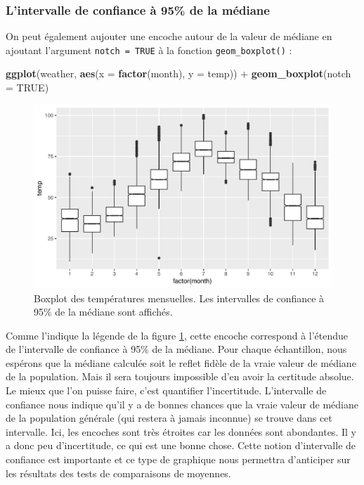 \documentclass[a4paperpaper,]{article}
\newenvironment{Shaded}{\begin{snugshade}}{\end{snugshade}}
\newcommand{\DataTypeTok}[1]{\textcolor[rgb]{0.00,0.34,0.68}{#1}}
\newcommand{\KeywordTok}[1]{\textcolor[rgb]{0.12,0.11,0.11}{\textbf{#1}}}
\newcommand{\NormalTok}[1]{\textcolor[rgb]{0.12,0.11,0.11}{#1}}
\newcommand{\OperatorTok}[1]{\textcolor[rgb]{0.12,0.11,0.11}{#1}}
\newcommand{\OtherTok}[1]{\textcolor[rgb]{0.00,0.43,0.16}{#1}}
\newcommand{\StringTok}[1]{\textcolor[rgb]{0.75,0.01,0.01}{#1}}
\begin{document}
\hypertarget{lintervalle-de-confiance-a-95-de-la-mediane}{%
\subsubsection{L'intervalle de confiance à 95\% de la médiane}\label{lintervalle-de-confiance-a-95-de-la-mediane}}

On peut également aujouter une encoche autour de la valeur de médiane en ajoutant l'argument \texttt{notch\ =\ TRUE} à la fonction \texttt{geom\_boxplot()} :

\begin{Shaded}
\begin{Highlighting}[]
\KeywordTok{ggplot}\NormalTok{(weather, }\KeywordTok{aes}\NormalTok{(}\DataTypeTok{x =} \KeywordTok{factor}\NormalTok{(month), }\DataTypeTok{y =}\NormalTok{ temp)) }\OperatorTok{+}
\StringTok{  }\KeywordTok{geom_boxplot}\NormalTok{(}\DataTypeTok{notch =} \OtherTok{TRUE}\NormalTok{)}
\end{Highlighting}
\end{Shaded}

\begin{figure}[htpb]

{\centering \includegraphics[width=0.9\linewidth]{figure/notchedboxplot-1} 

}

\caption{Boxplot des températures mensuelles. Les intervalles de confiance à 95\% de la médiane sont affichés.}\label{fig:notchedboxplot}
\end{figure}



Comme l'indique la légende de la figure \ref{fig:notchedboxplot}, cette encoche correspond à l'étendue de l'intervalle de confiance à 95\% de la médiane. Pour chaque échantillon, nous espérons que la médiane calculée soit le reflet fidèle de la vraie valeur de médiane de la population. Mais il sera toujours impossible d'en avoir la certitude absolue. Le mieux que l'on puisse faire, c'est quantifier l'incertitude. L'intervalle de confiance nous indique qu'il y a de bonnes chances que la vraie valeur de médiane de la population générale (qui restera à jamais inconnue) se trouve dans cet intervalle. Ici, les encoches sont très étroites car les données sont abondantes. Il y a donc peu d'incertitude, ce qui est une bonne chose. Cette notion d'intervalle de confiance est importante et ce type de graphique nous permettra d'anticiper sur les résultats des tests de comparaisons de moyennes.
\end{document}
